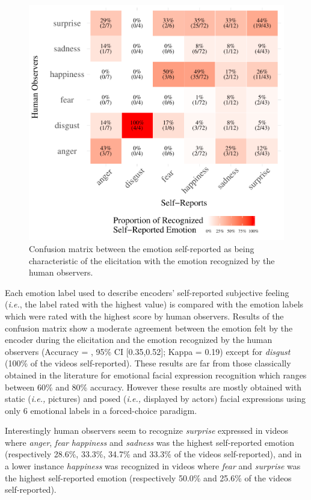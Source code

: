 \documentclass[conference,final,]{IEEEtran}
\makeatletter
\def\maxwidth{\ifdim\Gin@nat@width>\linewidth\linewidth
\else\Gin@nat@width\fi}
\let\Oldincludegraphics\includegraphics
\renewcommand{\includegraphics}[1]{\Oldincludegraphics[width=\maxwidth]{#1}}
\makeatother
\begin{document}
\begin{figure}
\centering
\includegraphics{ACII_2019_paper_files/figure-latex/confusionMatrix_sr_hr-1.pdf}
\caption{\label{fig:confusionMatrix_sr_hr}Confusion matrix between the
emotion self-reported as being characteristic of the elicitation with
the emotion recognized by the human observers.}
\end{figure}

Each emotion label used to describe encoders' self-reported subjective
feeling (\emph{i.e.}, the label rated with the highest value) is
compared with the emotion labels which were rated with the highest score
by human observers. Results of the confusion matrix show a moderate
agreement between the emotion felt by the encoder during the elicitation
and the emotion recognized by the human observers (Accuracy
\nolinebreak = , 95\% CI {[}0.35,0.52{]}; Kappa = 0.19)
except for \emph{disgust} (100\% of the videos self-reported). These
results are far from those classically obtained in the literature for
emotional facial expression recognition which ranges between 60\% and
80\% accuracy. However these results are mostly obtained with static
(\emph{i.e.,} pictures) and posed (\emph{i.e.,} displayed by actors)
facial expressions using only 6 emotional labels in a forced-choice
paradigm.

Interestingly human observers seem to recognize \emph{surprise}
expressed in videos where \emph{anger}, \emph{fear} \emph{happiness} and
\emph{sadness} was the highest self-reported emotion (respectively
28.6\%, 33.3\%, 34.7\% and 33.3\% of the videos self-reported), and in a
lower instance \emph{happiness} was recognized in videos where
\emph{fear} and \emph{surprise} was the highest self-reported emotion
(respectively 50.0\% and 25.6\% of the videos self-reported).
\end{document}
